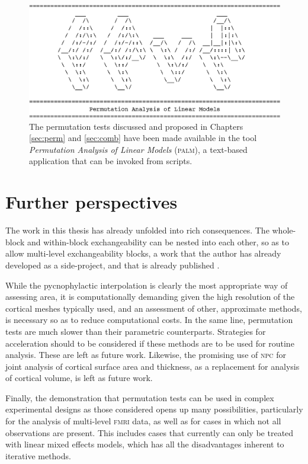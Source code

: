 \begin{figure}[tbp]
\begin{center}
\centerline{\includegraphics[width=12cm]{images/palm.eps}}
\end{center}
\caption[The proposed tests are available in \textsc{palm}.]{The permutation tests discussed and proposed in Chapters \ref{sec:perm} and \ref{sec:comb} have been made available in the tool \emph{Permutation Analysis of Linear Models} (\textsc{palm}), a text-based application that can be invoked from scripts.}
\label{fig:valor:palm}
\end{figure}

\section{Further perspectives}

The work in this thesis has already unfolded into rich consequences. The whole-block and within-block exchangeability can be nested into each other, so as to allow multi-level exchangeability blocks, a work that the author has already developed as a side-project, and that is already published \citep{Winkler2015}.

While the pycnophylactic interpolation is clearly the most appropriate way of assessing area, it is computationally demanding given the high resolution of the cortical meshes typically used, and an assessment of other, approximate methods, is necessary so as to reduce computational costs. In the same line, permutation tests are much slower than their parametric counterparts. Strategies for acceleration should to be considered if these methods are to be used for routine analysis. These are left as future work. Likewise, the promising use of \textsc{npc} for joint analysis of cortical surface area and thickness, as a replacement for analysis of cortical volume, is left as future work.

Finally, the demonstration that permutation tests can be used in complex experimental designs as those considered opens up many possibilities, particularly for the analysis of multi-level \textsc{fmri} data, as well as for cases in which not all observations are present. This includes cases that currently can only be treated with linear mixed effects models, which has all the disadvantages inherent to iterative methods.